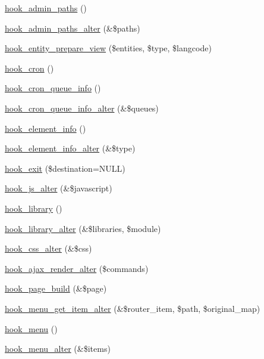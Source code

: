 \begin{DoxyCompactItemize}
\item 
\hyperlink{group__hooks_ga3fe6d93afc8bb04afbd9e3c326d1bdc1}{hook\_\-admin\_\-paths} ()
\item 
\hyperlink{group__hooks_ga027fc321194ec7bbc226ed6aff587e68}{hook\_\-admin\_\-paths\_\-alter} (\&\$paths)
\item 
\hyperlink{group__hooks_ga7e60ef817e60b20497bda315d2f30163}{hook\_\-entity\_\-prepare\_\-view} (\$entities, \$type, \$langcode)
\item 
\hyperlink{group__hooks_gaf07f1e3d98112fc2ba6920cf7ee6fb16}{hook\_\-cron} ()
\item 
\hyperlink{group__hooks_gae161ed78fd5e8775ffc9264346a64320}{hook\_\-cron\_\-queue\_\-info} ()
\item 
\hyperlink{group__hooks_gac9c5a8cc07a343c560e5ffac4a7de41f}{hook\_\-cron\_\-queue\_\-info\_\-alter} (\&\$queues)
\item 
\hyperlink{group__hooks_ga3c5182432eddc82f8b7845e66a365d51}{hook\_\-element\_\-info} ()
\item 
\hyperlink{group__hooks_gaf83b34170f31d93a7cfed56afa60007a}{hook\_\-element\_\-info\_\-alter} (\&\$type)
\item 
\hyperlink{group__hooks_gaab945bbc2e651510aee460dcc8691366}{hook\_\-exit} (\$destination=NULL)
\item 
\hyperlink{group__hooks_ga4e6dc7148292e5d6ce1754927a5ff06d}{hook\_\-js\_\-alter} (\&\$javascript)
\item 
\hyperlink{group__hooks_ga6bf3f83fa2e373836f5aa78fd143d1cd}{hook\_\-library} ()
\item 
\hyperlink{group__hooks_ga7256c50068666c9c02f43a08efcefae7}{hook\_\-library\_\-alter} (\&\$libraries, \$module)
\item 
\hyperlink{group__hooks_ga5337e8bfa5713fb37c132f039c0169da}{hook\_\-css\_\-alter} (\&\$css)
\item 
\hyperlink{group__hooks_ga52f3fed51f62747155cfd2b373de4ec6}{hook\_\-ajax\_\-render\_\-alter} (\$commands)
\item 
\hyperlink{group__hooks_ga16d8d8ae818dc759bbe539e16ff5b93b}{hook\_\-page\_\-build} (\&\$page)
\item 
\hyperlink{group__hooks_ga452b92c6bb89d61eefe0a86430c62d73}{hook\_\-menu\_\-get\_\-item\_\-alter} (\&\$router\_\-item, \$path, \$original\_\-map)
\item 
\hyperlink{group__hooks_ga5c95244fea59b25666e409759e133ded}{hook\_\-menu} ()
\item 
\hyperlink{group__hooks_ga4c37deddcf48dbfe6f3081df1652f6fa}{hook\_\-menu\_\-alter} (\&\$items)

\end{DoxyCompactItemize}
